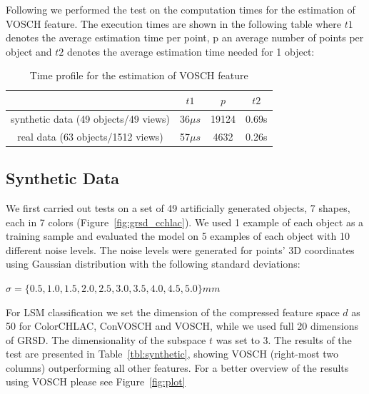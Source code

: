 \documentclass[conference]{sty/IEEEtran}
\begin{document}
Following we performed the test on the computation times for the estimation
of VOSCH feature. The execution times are shown in the following table where $t1$
denotes the average estimation time per point, p an average number of points per object
and $t2$ denotes the average estimation time needed for 1 object:
\begin{table}[ht]
\begin{center}
\begin{tabular}{|c|c|c|c|}
\hline
 & $t1$ & $p$ & $t2$ \\
\hline
synthetic data (49 objects/49 views) & 36$\mu s$ & 19124 & 0.69s \\
\hline
real data (63 objects/1512 views) & 57$\mu s$ & 4632 & 0.26s \\
\hline
\end{tabular}
\caption{Time profile for the estimation of VOSCH feature}
\label{tbl:timing}
\end{center}
\end{table}

\subsection{Synthetic Data}
We first carried out tests on a set of 49 artificially generated objects,
7 shapes, each in 7 colors (Figure~\ref{fig:grsd_cchlac}). We used 1 example of 
each object as a training sample and evaluated the model on 5 examples of each object with 
10 different noise levels. The noise levels were generated for points' 3D coordinates 
using Gaussian distribution with the following standard deviations:\\
\begin{center}
$\sigma = \{0.5, 1.0, 1.5, 2.0, 2.5, 3.0, 3.5, 4.0, 4.5, 5.0\}mm$ 
\end{center}
For LSM classification we set the dimension of the compressed feature space $d$ as 50 for ColorCHLAC, ConVOSCH and VOSCH, while 
we used full 20 dimensions of GRSD. The dimensionality of the subspace $t$ was set to 3.
The results of the test are presented in Table~\ref{tbl:synthetic},
showing VOSCH (right-most two columns) outperforming all other features.
For a better overview of the results using VOSCH please see Figure~\ref{fig:plot}
\end{document}
